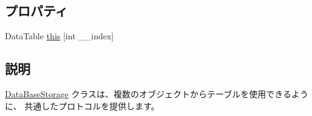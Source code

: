 \subsection*{プロパティ}
\begin{DoxyCompactItemize}
\item 
DataTable \hyperlink{classlazurite_1_1etherial_1_1_data_base_storage_a651282825d26768b12357ec12f0bf9ab}{this} \mbox{[}int \_\-\_\-index\mbox{]}
\end{DoxyCompactItemize}


\subsection{説明}
\hyperlink{classlazurite_1_1etherial_1_1_data_base_storage}{DataBaseStorage} クラスは、複数のオブジェクトからテーブルを使用できるように、 共通したプロトコルを提供します。 


